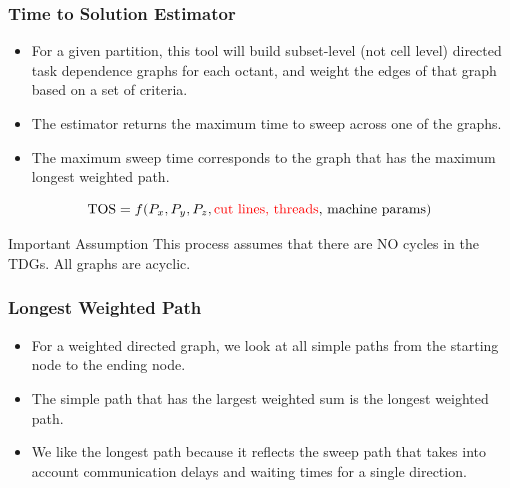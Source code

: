 \documentclass[xcolor={usenames,dvipsnames,svgnames,table}]{beamer}
\begin{document}
\begin{frame}[t]\frametitle{Time to Solution Estimator}
\begin{block}{}
\begin{itemize}
  \item For a given partition, this tool will build subset-level (not cell level) directed task dependence graphs for each octant, and weight the edges of that graph based on a set of criteria.
  \item The estimator returns the maximum time to sweep across one of the graphs.
  \item The maximum sweep time corresponds to the graph that has the maximum longest weighted path. 
\end{itemize}
\end{block}
\begin{block}{}
\begin{equation}
\text{TOS} = f(P_x, P_y, P_z, \text{\textcolor{red}{cut lines, threads}, machine params})
\end{equation}
\end{block}
\begin{block}{Important Assumption}
This process assumes that there are NO cycles in the TDGs. All graphs are acyclic.
\end{block}
\end{frame}

\begin{frame}[t]\frametitle{Longest Weighted Path}
\begin{block}{}
\begin{itemize}
	\item For a weighted directed graph, we look at all simple paths from the starting node to the ending node.
	\item The simple path that has the largest weighted sum is the longest weighted path.
	\item We like the longest path because it reflects the sweep path that takes into account communication delays and waiting times for a single direction.
\end{itemize}
\end{block}
\end{frame}
\end{document}
